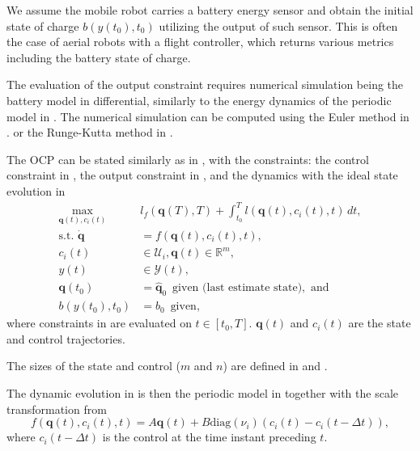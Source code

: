 We assume the mobile robot carries a battery energy sensor and obtain the initial state of charge $b(y(t_0),t_0)$ utilizing the output of such sensor. This is often the case of aerial robots with a flight controller, which returns various metrics including the battery state of charge. 

The evaluation of the output constraint requires numerical simulation being the battery model in  differential, similarly to the energy dynamics of the periodic model in . The numerical simulation can be computed using the Euler method in . or the Runge-Kutta method in .

The OCP can be stated similarly as in , with the constraints: the control constraint in , the output constraint in , and the dynamics with the ideal state evolution in 
\begin{subequations}\label{eq:ocp-output-mpc}\begin{align}
   \max_{\mathbf{q}(t),c_i(t)}&{l_f(\mathbf{q}(T),T)+\int_{t_0}^T{l(\mathbf{q}(t),c_i(t),t)\,dt}},\\
   \text{s.t. }\dot{\mathbf{q}}&=f(\mathbf{q}(t),c_i(t),t),\label{eq:dyn-evol}\\
   c_i(t)&\in\mathcal{U}_i,\mathbf{q}(t)\in\mathbb{R}^m,\label{eq:state-cont-const-mpc}\\
   y(t)&\in\mathcal{Y}(t),\label{eq:batt-const-mpc}\\
   \mathbf{q}(t_0)&=\hat{\mathbf{q}}_0\,\,\,\text{given (last estimate state)},\text{ and}\\
   b(y(t_0),t_0)&=b_0\,\,\,\text{given},
\end{align}\end{subequations}
where constraints in  are evaluated on $t\in[t_0,T]$. $\mathbf{q}(t)$ and $c_i(t)$ are the state and control trajectories. 

The sizes of the state and control ($m$ and $n$) are defined in  and . 

The dynamic evolution in  is then the periodic model in  together with the scale transformation from 
\begin{equation}\label{eq:perf-model-in-mpc}
  f(\mathbf{q}(t),c_i(t),t)=A\mathbf{q}(t)+B\mathrm{diag}(\nu_i)(c_i(t)-c_i(t-\Delta t)),
\end{equation}
where $c_i(t-\Delta t)$ is the control at the time instant preceding $t$.

